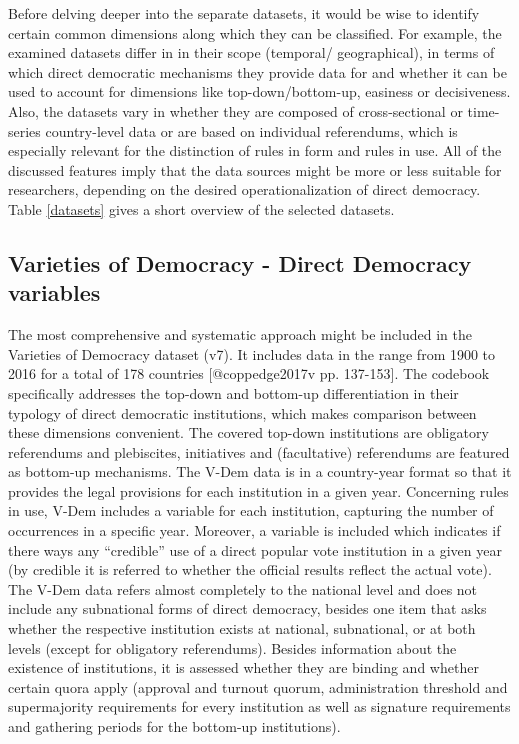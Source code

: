 \documentclass[]{article}
\begin{document}
Before delving deeper into the separate datasets, it would be wise to
identify certain common dimensions along which they can be classified.
For example, the examined datasets differ in in their scope (temporal/
geographical), in terms of which direct democratic mechanisms they
provide data for and whether it can be used to account for dimensions
like top-down/bottom-up, easiness or decisiveness. Also, the datasets
vary in whether they are composed of cross-sectional or time-series
country-level data or are based on individual referendums, which is
especially relevant for the distinction of rules in form and rules in
use. All of the discussed features imply that the data sources might be
more or less suitable for researchers, depending on the desired
operationalization of direct democracy. Table \ref{datasets} gives a
short overview of the selected datasets.

\subsection{Varieties of Democracy - Direct Democracy
variables}\label{varieties-of-democracy---direct-democracy-variables}

The most comprehensive and systematic approach might be included in the
Varieties of Democracy dataset (v7). It includes data in the range from
1900 to 2016 for a total of 178 countries {[}@coppedge2017v pp.
137-153{]}. The codebook specifically addresses the top-down and
bottom-up differentiation in their typology of direct democratic
institutions, which makes comparison between these dimensions
convenient. The covered top-down institutions are obligatory referendums
and plebiscites, initiatives and (facultative) referendums are featured
as bottom-up mechanisms. The V-Dem data is in a country-year format so
that it provides the legal provisions for each institution in a given
year. Concerning rules in use, V-Dem includes a variable for each
institution, capturing the number of occurrences in a specific year.
Moreover, a variable is included which indicates if there ways any
``credible'' use of a direct popular vote institution in a given year
(by credible it is referred to whether the official results reflect the
actual vote). The V-Dem data refers almost completely to the national
level and does not include any subnational forms of direct democracy,
besides one item that asks whether the respective institution exists at
national, subnational, or at both levels (except for obligatory
referendums). Besides information about the existence of institutions,
it is assessed whether they are binding and whether certain quora apply
(approval and turnout quorum, administration threshold and supermajority
requirements for every institution as well as signature requirements and
gathering periods for the bottom-up institutions).
\end{document}
